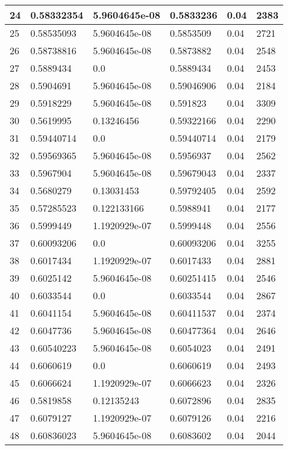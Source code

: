 \begin{longtable}{|l|l|l|l|l|l|}
24 & 0.58332354 & 5.9604645e-08 & 0.5833236 & 0.04 & 2383 \\ \hline 
25 & 0.58535093 & 5.9604645e-08 & 0.5853509 & 0.04 & 2721 \\ \hline 
26 & 0.58738816 & 5.9604645e-08 & 0.5873882 & 0.04 & 2548 \\ \hline 
27 & 0.5889434 & 0.0 & 0.5889434 & 0.04 & 2453 \\ \hline 
28 & 0.5904691 & 5.9604645e-08 & 0.59046906 & 0.04 & 2184 \\ \hline 
29 & 0.5918229 & 5.9604645e-08 & 0.591823 & 0.04 & 3309 \\ \hline 
30 & 0.5619995 & 0.13246456 & 0.59322166 & 0.04 & 2290 \\ \hline 
31 & 0.59440714 & 0.0 & 0.59440714 & 0.04 & 2179 \\ \hline 
32 & 0.59569365 & 5.9604645e-08 & 0.5956937 & 0.04 & 2562 \\ \hline 
33 & 0.5967904 & 5.9604645e-08 & 0.59679043 & 0.04 & 2337 \\ \hline 
34 & 0.5680279 & 0.13031453 & 0.59792405 & 0.04 & 2592 \\ \hline 
35 & 0.57285523 & 0.122133166 & 0.5988941 & 0.04 & 2177 \\ \hline 
36 & 0.5999449 & 1.1920929e-07 & 0.5999448 & 0.04 & 2556 \\ \hline 
37 & 0.60093206 & 0.0 & 0.60093206 & 0.04 & 3255 \\ \hline 
38 & 0.6017434 & 1.1920929e-07 & 0.6017433 & 0.04 & 2881 \\ \hline 
39 & 0.6025142 & 5.9604645e-08 & 0.60251415 & 0.04 & 2546 \\ \hline 
40 & 0.6033544 & 0.0 & 0.6033544 & 0.04 & 2867 \\ \hline 
41 & 0.6041154 & 5.9604645e-08 & 0.60411537 & 0.04 & 2374 \\ \hline 
42 & 0.6047736 & 5.9604645e-08 & 0.60477364 & 0.04 & 2646 \\ \hline 
43 & 0.60540223 & 5.9604645e-08 & 0.6054023 & 0.04 & 2491 \\ \hline 
44 & 0.6060619 & 0.0 & 0.6060619 & 0.04 & 2493 \\ \hline 
45 & 0.6066624 & 1.1920929e-07 & 0.6066623 & 0.04 & 2326 \\ \hline 
46 & 0.5819858 & 0.12135243 & 0.6072896 & 0.04 & 2835 \\ \hline 
47 & 0.6079127 & 1.1920929e-07 & 0.6079126 & 0.04 & 2216 \\ \hline 
48 & 0.60836023 & 5.9604645e-08 & 0.6083602 & 0.04 & 2044 \\ \hline 

\end{longtable}
